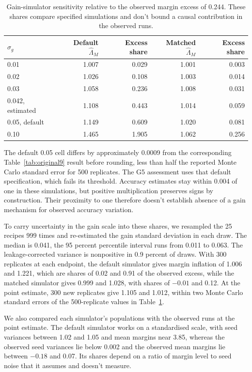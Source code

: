 \begin{table}[!htb]
\centering
\caption{Gain-simulator sensitivity relative to the observed margin excess of 0.244. These shares compare specified simulations and don't bound a causal contribution in the observed runs.}
\label{tab:original13}
\small\setlength{\tabcolsep}{4pt}\renewcommand{\arraystretch}{1.12}
\begin{tabular}{lrrrr}\toprule
$\sigma_g$ & Default $\widehat\Lambda_M$ & Excess share & Matched $\widehat\Lambda_M$ & Excess share\\\midrule
0.01 & 1.007 & 0.029 & 1.001 & 0.003\\
0.02 & 1.026 & 0.108 & 1.003 & 0.014\\
0.03 & 1.058 & 0.236 & 1.008 & 0.031\\
0.042, estimated & 1.108 & 0.443 & 1.014 & 0.059\\
0.05, default & 1.149 & 0.609 & 1.020 & 0.081\\
0.10 & 1.465 & 1.905 & 1.062 & 0.256\\\bottomrule
\end{tabular}
\end{table}

The default 0.05 cell differs by approximately 0.0009 from the corresponding Table~\ref{tab:original9} result before rounding, less than half the reported Monte Carlo standard error for 500 replicates. The G5 assessment uses that default specification, which fails its threshold. Accuracy estimates stay within 0.004 of one in these simulations, but positive multiplication preserves signs by construction. Their proximity to one therefore doesn't establish absence of a gain mechanism for observed accuracy variation.

To carry uncertainty in the gain scale into these shares, we resampled the 25 recipes 999 times and re-estimated the gain standard deviation in each draw. The median is 0.041, the 95 percent percentile interval runs from 0.011 to 0.063. The leakage-corrected variance is nonpositive in 0.9 percent of draws. With 300 replicates at each endpoint, the default simulator gives margin inflation of 1.006 and 1.221, which are shares of 0.02 and 0.91 of the observed excess, while the matched simulator gives 0.999 and 1.028, with shares of $-0.01$ and 0.12. At the point estimate, 300 new replicates give 1.105 and 1.012, within two Monte Carlo standard errors of the 500-replicate values in Table~\ref{tab:original13}.

We also compared each simulator's populations with the observed runs at the point estimate. The default simulator works on a standardised scale, with seed variances between 1.02 and 1.05 and mean margins near 3.85, whereas the observed seed variances lie below 0.002 and the observed mean margins lie between $-0.18$ and 0.07. Its shares depend on a ratio of margin level to seed noise that it assumes and doesn't measure.

